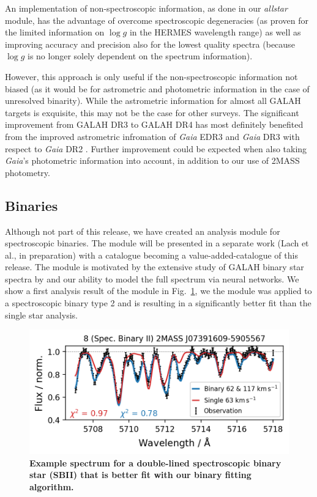 \documentclass[
  journal=pasa,
  manuscript=research-paper, %
  year=2023,
  volume=37
]{cup-journal}
\newcommand{\logg}{$\log g$\xspace}
\begin{document}
An implementation of non-spectroscopic information, as done in our \textit{allstar} module, has the advantage of overcome spectroscopic degeneracies (as proven for the limited information on \logg in the HERMES wavelength range) as well as improving accuracy and precision also for the lowest quality spectra (because \logg is no longer solely dependent on the spectrum information).

However, this approach is only useful if the non-spectroscopic information not biased (as it would be for astrometric and photometric information in the case of unresolved binarity). While the astrometric information for almost all GALAH targets is exquisite, this may not be the case for other surveys. The significant improvement from GALAH DR3 to GALAH DR4 has most definitely benefited from the improved astrometric infromation of \textit{Gaia} EDR3 \citep{GaiaEDR3, Lindegren2021a} and \textit{Gaia} DR3 \citep{GaiaDR3} with respect to \textit{Gaia} DR2 \citep{Brown2018, Lindegren2018}. Further improvement could be expected when also taking \textit{Gaia}'s photometric information into account, in addition to our use of 2MASS photometry.

\subsection{Binaries} \label{sec:caveats_binaries}

Although not part of this release, we have created an analysis module for spectroscopic binaries. The module will be presented in a separate work (Lach et al., in preparation) with a catalogue becoming a value-added-catalogue of this release. The module is motivated by the extensive study of GALAH binary star spectra by \citet{Traven2020} and our ability to model the full spectrum via neural networks. We show a first analysis result of the module in Fig.~\ref{fig:examples_flag_sp_3}, we the module was applied to a spectroscopic binary type 2 and is resulting in a significantly better fit than the single star analysis.

\begin{figure}[ht]
 \centering
 \includegraphics[width=\textwidth]{figures/examples_flag_sp_3.png}
 \caption{\textbf{Example spectrum for a double-lined spectroscopic binary star (SBII) that is better fit with our binary fitting algorithm.}} \label{fig:examples_flag_sp_3}
\end{figure}
\end{document}
